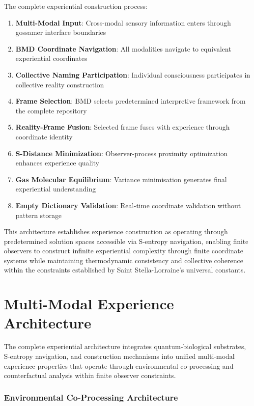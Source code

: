 \documentclass{article}
\begin{document}
The complete experiential construction process:
\begin{enumerate}
\item \textbf{Multi-Modal Input}: Cross-modal sensory information enters through gossamer interface boundaries
\item \textbf{BMD Coordinate Navigation}: All modalities navigate to equivalent experiential coordinates
\item \textbf{Collective Naming Participation}: Individual consciousness participates in collective reality construction
\item \textbf{Frame Selection}: BMD selects predetermined interpretive framework from the complete repository
\item \textbf{Reality-Frame Fusion}: Selected frame fuses with experience through coordinate identity
\item \textbf{S-Distance Minimization}: Observer-process proximity optimization enhances experience quality
\item \textbf{Gas Molecular Equilibrium}: Variance minimisation generates final experiential understanding
\item \textbf{Empty Dictionary Validation}: Real-time coordinate validation without pattern storage
\end{enumerate}

This architecture establishes experience construction as operating through predetermined solution spaces accessible via S-entropy navigation, enabling finite observers to construct infinite experiential complexity through finite coordinate systems while maintaining thermodynamic consistency and collective coherence within the constraints established by Saint Stella-Lorraine's universal constants.

\section{Multi-Modal Experience Architecture}

The complete experiential architecture integrates quantum-biological substrates, S-entropy navigation, and construction mechanisms into unified multi-modal experience properties that operate through environmental co-processing and counterfactual analysis within finite observer constraints.

\subsubsection{Environmental Co-Processing Architecture}
\end{document}
